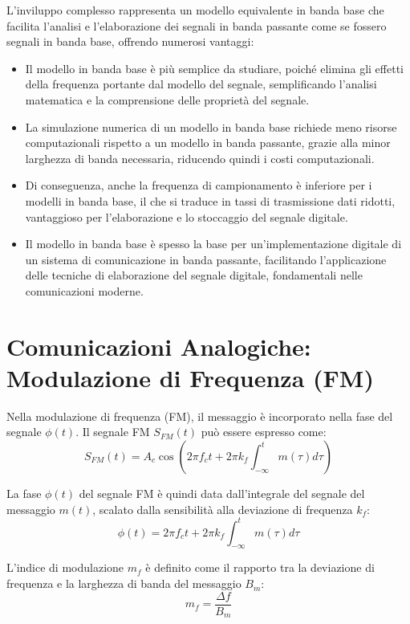 L'inviluppo complesso rappresenta un modello equivalente in banda base che facilita l'analisi e l'elaborazione dei segnali in banda passante come se fossero segnali in banda base, offrendo numerosi vantaggi:
\begin{itemize}
    \item Il modello in banda base è più semplice da studiare, poiché elimina gli effetti della frequenza portante dal modello del segnale, semplificando l'analisi matematica e la comprensione delle proprietà del segnale.
    \item La simulazione numerica di un modello in banda base richiede meno risorse computazionali rispetto a un modello in banda passante, grazie alla minor larghezza di banda necessaria, riducendo quindi i costi computazionali.
    \item Di conseguenza, anche la frequenza di campionamento è inferiore per i modelli in banda base, il che si traduce in tassi di trasmissione dati ridotti, vantaggioso per l'elaborazione e lo stoccaggio del segnale digitale.
    \item Il modello in banda base è spesso la base per un'implementazione digitale di un sistema di comunicazione in banda passante, facilitando l'applicazione delle tecniche di elaborazione del segnale digitale, fondamentali nelle comunicazioni moderne.
\end{itemize}

\section*{Comunicazioni Analogiche: Modulazione di Frequenza (FM)}

Nella modulazione di frequenza (FM), il messaggio è incorporato nella fase del segnale \( \phi(t) \). Il segnale FM \( S_{FM}(t) \) può essere espresso come:
\begin{equation}
    S_{FM}(t) = A_c \cos\left(2\pi f_c t + 2\pi k_f \int_{-\infty}^{t} m(\tau) d\tau \right)
\end{equation}

La fase \( \phi(t) \) del segnale FM è quindi data dall'integrale del segnale del messaggio \( m(t) \), scalato dalla sensibilità alla deviazione di frequenza \( k_f \):
\begin{equation}
    \phi(t) = 2\pi f_c t + 2\pi k_f \int_{-\infty}^{t} m(\tau) d\tau
\end{equation}

L'indice di modulazione \( m_f \) è definito come il rapporto tra la deviazione di frequenza e la larghezza di banda del messaggio \( B_m \):
\begin{equation}
    m_f = \frac{\Delta f}{B_m}
\end{equation}


